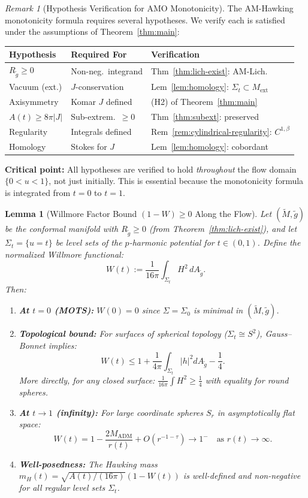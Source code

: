\documentclass[12pt]{article}
\theoremstyle{plain}
\newtheorem{lemma}[theorem]{Lemma}
\theoremstyle{definition}
\theoremstyle{remark}
\newtheorem{remark}[theorem]{Remark}
\newcommand{\ADM}{\mathrm{ADM}}
\newcommand{\tM}{\tilde{M}}
\newcommand{\tg}{\tilde{g}}
\begin{document}
\begin{remark}[Hypothesis Verification for AMO Monotonicity]\label{rem:amo-hypothesis}
The AM-Hawking monotonicity formula requires several hypotheses. We verify each is satisfied under the assumptions of Theorem~\ref{thm:main}:

\smallskip
\begin{tabular}{@{}p{3.2cm}p{4.2cm}p{4.8cm}@{}}
\textbf{Hypothesis} & \textbf{Required For} & \textbf{Verification} \\
\hline
$R_{\tilde{g}} \geq 0$ & Non-neg.\ integrand & Thm~\ref{thm:lich-exist}: AM-Lich. \\
Vacuum (ext.) & $J$-conservation & Lem~\ref{lem:homology}: $\Sigma_t \subset M_{\mathrm{ext}}$ \\
Axisymmetry & Komar $J$ defined & (H2) of Theorem~\ref{thm:main} \\
$A(t) \geq 8\pi|J|$ & Sub-extrem.\ $\geq 0$ & Thm~\ref{thm:subext}: preserved \\
Regularity & Integrals defined & Rem~\ref{rem:cylindrical-regularity}: $C^{1,\beta}$ \\
Homology & Stokes for $J$ & Lem~\ref{lem:homology}: cobordant \\
\end{tabular}

\smallskip
\textbf{Critical point:} All hypotheses are verified to hold \emph{throughout} the flow domain $\{0 < u < 1\}$, not just initially. This is essential because the monotonicity formula is integrated from $t=0$ to $t=1$.
\end{remark}

\begin{lemma}[Willmore Factor Bound $(1-W) \geq 0$ Along the Flow]\label{lem:willmore-factor-bound}
Let $(\tM, \tg)$ be the conformal manifold with $R_{\tg} \geq 0$ (from Theorem~\ref{thm:lich-exist}), and let $\Sigma_t = \{u = t\}$ be level sets of the $p$-harmonic potential for $t \in (0,1)$. Define the normalized Willmore functional:
\[
W(t) := \frac{1}{16\pi}\int_{\Sigma_t} H^2 \, dA_{\tg}.
\]
Then:
\begin{enumerate}[label=\textup{(\roman*)}]
    \item \textbf{At $t = 0$ (MOTS):} $W(0) = 0$ since $\Sigma = \Sigma_0$ is minimal in $(\tM, \tg)$.
    \item \textbf{Topological bound:} For surfaces of spherical topology ($\Sigma_t \cong S^2$), Gauss--Bonnet implies:
    \[
    W(t) \leq 1 + \frac{1}{4\pi}\int_{\Sigma_t}|h|^2 dA_{\tg} - \frac{1}{4}.
    \]
    More directly, for any closed surface: $\frac{1}{16\pi}\int H^2 \geq \frac{1}{4}$ with equality for round spheres.
    \item \textbf{At $t \to 1$ (infinity):} For large coordinate spheres $S_r$ in asymptotically flat space:
    \[
    W(t) = 1 - \frac{2M_{\ADM}}{r(t)} + O(r^{-1-\tau}) \to 1^- \quad \text{as } r(t) \to \infty.
    \]
    \item \textbf{Well-posedness:} The Hawking mass $m_H(t) = \sqrt{A(t)/(16\pi)}(1 - W(t))$ is well-defined and non-negative for all regular level sets $\Sigma_t$.
\end{enumerate}
\end{lemma}
\end{document}
